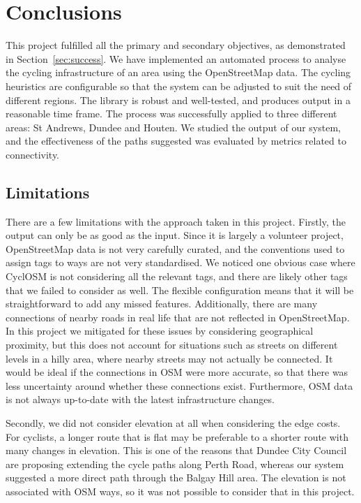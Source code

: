\documentclass[12pt,a4paper]{report}
\begin{document}
\chapter{Conclusions}\label{chapter:concl}
This project fulfilled all the primary and secondary objectives, as demonstrated in Section~\ref{sec:success}. We have implemented an automated process to analyse the cycling infrastructure of an area using the OpenStreetMap data. The cycling heuristics are configurable so that the system can be adjusted to suit the need of different regions. The library is robust and well-tested, and produces output in a reasonable time frame. The process was successfully applied to three different areas: St Andrews, Dundee and Houten. We studied the output of our system, and the effectiveness of the paths suggested was evaluated by metrics related to connectivity.

\section{Limitations}
There are a few limitations with the approach taken in this project. Firstly, the output can only be as good as the input. Since it is largely a volunteer project, OpenStreetMap data is not very carefully curated, and the conventions used to assign tags to ways are not very standardised. We noticed one obvious case where CyclOSM is not considering all the relevant tags, and there are likely other tags that we failed to consider as well. The flexible configuration means that it will be straightforward to add any missed features. Additionally, there are many connections of nearby roads in real life that are not reflected in OpenStreetMap. In this project we mitigated for these issues by considering geographical proximity, but this does not account for situations such as streets on different levels in a hilly area, where nearby streets may not actually be connected. It would be ideal if the connections in OSM were more accurate, so that there was less uncertainty around whether these connections exist. Furthermore, OSM data is not always up-to-date with the latest infrastructure changes.

Secondly, we did not consider elevation at all when considering the edge costs. For cyclists, a longer route that is flat may be preferable to a shorter route with many changes in elevation. This is one of the reasons that Dundee City Council~\cite{robertson:dundee} are proposing extending the cycle paths along Perth Road, whereas our system suggested a more direct path through the Balgay Hill area. The elevation is not associated with OSM ways, so it was not possible to consider that in this project.
\end{document}
